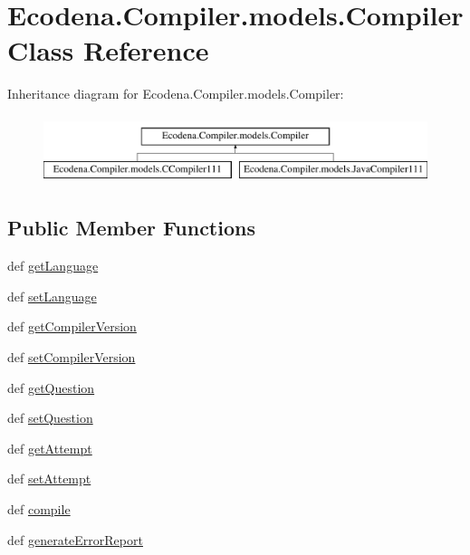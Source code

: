 \hypertarget{class_ecodena_1_1_compiler_1_1models_1_1_compiler}{
\section{Ecodena.Compiler.models.Compiler Class Reference}
\label{d1/d44/class_ecodena_1_1_compiler_1_1models_1_1_compiler}
}
Inheritance diagram for Ecodena.Compiler.models.Compiler:\begin{figure}[H]
\begin{center}
\leavevmode
\includegraphics[height=2.000000cm]{d1/d44/class_ecodena_1_1_compiler_1_1models_1_1_compiler}
\end{center}
\end{figure}
\subsection*{Public Member Functions}
\begin{DoxyCompactItemize}
\item 
def \hyperlink{class_ecodena_1_1_compiler_1_1models_1_1_compiler_a424db9705de2dbb37f478396258910c6}{getLanguage}
\item 
def \hyperlink{class_ecodena_1_1_compiler_1_1models_1_1_compiler_a32e0373464648483ed4ef72adda8aace}{setLanguage}
\item 
def \hyperlink{class_ecodena_1_1_compiler_1_1models_1_1_compiler_af3d8e4da3b646fc24c2f429eeb24dd0a}{getCompilerVersion}
\item 
def \hyperlink{class_ecodena_1_1_compiler_1_1models_1_1_compiler_a644100eea8657ac3eab60f3bebd6897f}{setCompilerVersion}
\item 
def \hyperlink{class_ecodena_1_1_compiler_1_1models_1_1_compiler_a7829ac76bd31e6fcaa2dcc1a4c39ac6c}{getQuestion}
\item 
def \hyperlink{class_ecodena_1_1_compiler_1_1models_1_1_compiler_af4e56359a55b3d1fb4d56478e3f284d9}{setQuestion}
\item 
def \hyperlink{class_ecodena_1_1_compiler_1_1models_1_1_compiler_aebe3d34f62170e0aee2abbed8cdc9d73}{getAttempt}
\item 
def \hyperlink{class_ecodena_1_1_compiler_1_1models_1_1_compiler_a77d0ff84d4d46fea994731b354a8e3db}{setAttempt}
\item 
def \hyperlink{class_ecodena_1_1_compiler_1_1models_1_1_compiler_a3de99c7aab62cbc96fbb1c83ba575cdd}{compile}
\item 
def \hyperlink{class_ecodena_1_1_compiler_1_1models_1_1_compiler_ae867e3f3258fe4c3e7cf283ef7007368}{generateErrorReport}
\end{DoxyCompactItemize}
